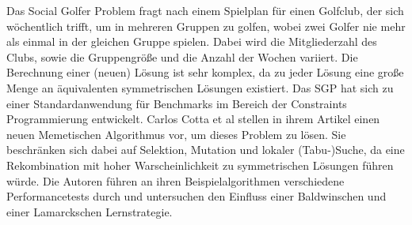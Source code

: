 Das Social Golfer Problem fragt nach einem Spielplan für einen Golfclub, der sich wöchentlich trifft, um in mehreren Gruppen zu golfen, wobei zwei Golfer nie mehr als einmal in der gleichen Gruppe spielen.
Dabei wird die Mitgliederzahl des Clubs, sowie die Gruppengröße und die Anzahl der Wochen variiert.
Die Berechnung einer (neuen) Lösung ist sehr komplex, da zu jeder Lösung eine große Menge an äquivalenten symmetrischen Lösungen existiert.
Das SGP hat sich zu einer Standardanwendung für Benchmarks im Bereich der Constraints Programmierung entwickelt.
Carlos Cotta et al stellen in ihrem Artikel \cite{cotta06} einen neuen Memetischen Algorithmus vor, um dieses Problem zu lösen. 
Sie beschränken sich dabei auf Selektion, Mutation und lokaler (Tabu-)Suche, da eine Rekombination mit hoher Warscheinlichkeit zu symmetrischen Lösungen führen würde.
Die Autoren führen an ihren Beispielalgorithmen verschiedene Performancetests durch und untersuchen den Einfluss einer Baldwinschen und einer Lamarckschen Lernstrategie.
